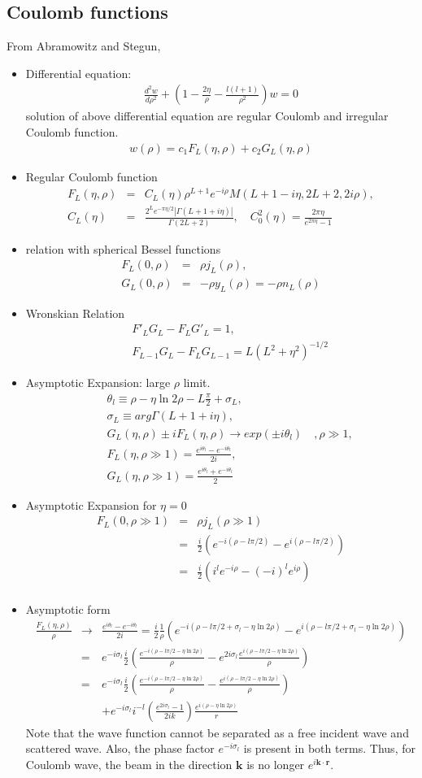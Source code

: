 \documentclass[10pt]{book}
\def\bm{\boldsymbol}
\newcommand{\bea}{\begin{eqnarray}}
\newcommand{\eea}{\end{eqnarray}}
\newcommand{\no}{\nonumber \\}
\def\vk{{\bm k}}
\def\vr{{\bm r}}
\begin{document}
\subsection{Coulomb functions}
From Abramowitz and Stegun,
\begin{itemize}
\item Differential equation:
 \bea 
 \frac{d^2 w}{d\rho^2}+\left(1-\frac{2\eta}{\rho}-\frac{l(l+1)}{\rho^2}\right) w=0
 \eea 
 solution of above differential equation are regular Coulomb and irregular Coulomb function.
 \bea 
 w(\rho)= c_1 F_L(\eta,\rho)+c_2 G_L(\eta,\rho)
 \eea 
\item Regular Coulomb function
\bea 
F_L(\eta,\rho)
  &=& C_L(\eta) \rho^{L+1} e^{-i\rho}
    M(L+1-i\eta,2L+2,2i\rho) ,\no 
C_L(\eta)&=& \frac{2^L e^{-\pi\eta/2}|\Gamma(L+1+i\eta)|}{\Gamma(2L+2)}, \quad 
C_0^2(\eta)=\frac{2\pi\eta}{e^{2\pi\eta}-1}     
\eea
\item relation with spherical Bessel functions
\bea 
F_L(0,\rho)&=&\rho j_L(\rho),\no 
G_L(0,\rho)&=&-\rho y_L(\rho)=-\rho n_L(\rho)
\eea 
\item Wronskian Relation
\bea 
& &F'_L G_L-F_L G'_L =1,\no 
& &F_{L-1}G_L-F_L G_{L-1}=L(L^2+\eta^2)^{-1/2}
\eea   

\item Asymptotic Expansion: large $\rho$ limit.
\bea 
& &\theta_l\equiv \rho-\eta\ln 2\rho-L\frac{\pi}{2}+\sigma_L ,\no 
& &\sigma_L\equiv arg \Gamma(L+1+i\eta) ,\no 
& &G_L(\eta,\rho)\pm i F_L(\eta,\rho)
\to exp(\pm i \theta_l) \quad, \rho\gg 1,
\no 
& &F_L(\eta,\rho\gg 1)=\frac{e^{i\theta_l}-e^{-i\theta_l}}{2i},
\no 
& &G_L(\eta,\rho\gg 1)=\frac{e^{i\theta_l}+e^{-i\theta_l}}{2}
\eea 

\item Asymptotic Expansion for $\eta=0$
\bea 
F_L(0,\rho\gg 1)&=&\rho j_L(\rho\gg 1) \no 
  &=&\frac{i}{2}\left(e^{-i(\rho-l\pi/2)}-e^{i(\rho-l\pi/2)}\right)  \no 
  &=&\frac{i}{2}\left(i^l e^{-i\rho}-(-i)^l e^{i \rho}\right)\no 
\eea 

\item Asymptotic form
\bea
\frac{F_L(\eta,\rho)}{\rho}
&\to & \frac{e^{i\theta_l}-e^{-i\theta_l}}{2i}
  =\frac{i}{2}\frac{1}{\rho}\left( 
   e^{-i(\rho-l\pi/2+\sigma_l-\eta\ln 2\rho)}
   -e^{i(\rho-l\pi/2+\sigma_l-\eta\ln 2\rho)} \right) \no 
&=& e^{-i\sigma_l}\frac{i}{2}\left( 
   \frac{e^{-i(\rho-l\pi/2-\eta\ln 2\rho)}}{\rho} 
   -e^{2i\sigma_l}\frac{e^{i(\rho-l\pi/2-\eta\ln 2\rho)}}{\rho} \right)  \no 
&=& e^{-i\sigma_l}\frac{i}{2}\left( 
   \frac{e^{-i(\rho-l\pi/2-\eta\ln 2\rho)}}{\rho}-
    \frac{e^{i(\rho-l\pi/2-\eta\ln 2\rho)}}{\rho}\right) \no & &
    +e^{-i\sigma_l} i^{-l}
    \left(\frac{e^{2i\sigma_l}-1}{2ik}\right)
     \frac{e^{i(\rho-\eta\ln 2\rho)}}{r}     
\eea 
Note that the wave function cannot be separated as a
free incident wave and scattered wave. Also, 
the phase factor $e^{-i\sigma_l}$ is present in both terms.
Thus, for Coulomb wave, 
the beam in the direction $\vk$ is no longer $e^{i\vk\cdot\vr}$. 


\end{itemize}
\end{document}
